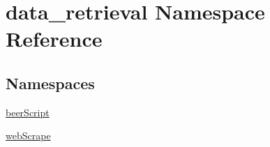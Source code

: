 \hypertarget{namespacedata__retrieval}{}\section{data\+\_\+retrieval Namespace Reference}
\label{namespacedata__retrieval}
\subsection*{Namespaces}
\begin{DoxyCompactItemize}
\item 
 \hyperlink{namespacedata__retrieval_1_1beer_script}{beer\+Script}
\item 
 \hyperlink{namespacedata__retrieval_1_1web_scrape}{web\+Scrape}
\end{DoxyCompactItemize}
